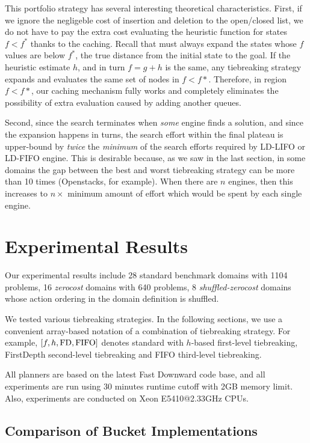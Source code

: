 This portfolio strategy has several interesting theoretical characteristics. First, if we ignore the negligeble cost of insertion and deletion to the open/closed list, we do not have to pay the extra cost evaluating the heuristic function for states $f<f^*$ thanks to the caching.
Recall that \astar must always expand the states whose $f$ values are below $f^*$, the true distance from the initial state to the goal. If the heuristic estimate $h$, and in turn $f=g+h$ is the same, any tiebreaking strategy expands and evaluates the same set of nodes in $f<f*$.
Therefore, in region $f<f*$, our caching mechanism fully works and completely eliminates the possibility of extra evaluation caused by adding another queues.

Second, since the search terminates when \emph{some} engine finds a solution, and since the expansion happens in turns, the search effort within the final plateau is upper-bound by \emph{twice} the \emph{minimum} of the search efforts required by LD-LIFO or LD-FIFO engine. This is desirable because, as we saw in the last section, in some domains the gap between the best and worst tiebreaking strategy can be more than 10 times (Openstacks, for example).
When there are $n$ engines, then this increases to $n\times$ minimum
amount of effort which would be spent by each single engine.

\section{Experimental Results}

Our experimental results include 28 standard benchmark domains with
1104 problems, 16 \emph{zerocost} domains with 640 problems, 8 \emph{shuffled-zerocost} 
domains whose action ordering in the domain definition is shuffled.

We tested various tiebreaking strategies. In the following sections, we
use a convenient array-based notation of a combination of tiebreaking
strategy.  For example, $[f,h,\mbox{FD},\mbox{FIFO}]$ denotes standard \astar with
$h$-based first-level tiebreaking, FirstDepth second-level tiebreaking and FIFO
third-level tiebreaking.

All planners are based on the latest Fast Downward code base, and all
experiments are run using 30 minutes runtime cutoff with 2GB memory
limit. Also, experiments are conducted on Xeon E5410@2.33GHz CPUs.

\subsection{Comparison of Bucket Implementations}

